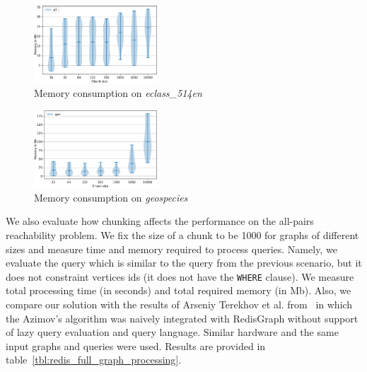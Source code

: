 \begin{figure}[t]
\centering
\includegraphics[width=0.41\textwidth]{data/raw_memory/eclass_514en.pdf}
\caption{Memory consumption on \textit{eclass\_514en}}
\label{fig:redis_memory_eclass}
\end{figure}

\begin{figure}[t]
\centering
\includegraphics[width=0.41\textwidth]{data/raw_memory/geospecies.pdf}
\caption{Memory consumption on \textit{geospecies}}
\label{fig:redis_memory_geospecies}
\end{figure}



We also evaluate how chunking affects the performance on the all-pairs reachability problem.
We fix the size of a chunk to be 1000 for graphs of different sizes and measure time and memory required to process queries.
Namely, we evaluate the query which is similar to the query from the previous scenario, but it does not constraint vertices ids (it does not have the \texttt{WHERE} clause).
We measure total processing time (in seconds) and total required memory (in Mb).
Also, we compare our solution with the results of Arseniy Terekhov et al. from~\cite{10.1145/3398682.3399163} in which the Azimov's algorithm was naively integrated with RedisGraph without support of lazy query evaluation and query language.
Similar hardware and the same input graphs and queries were used.
Results are provided in table~\ref{tbl:redis_full_graph_processing}.


